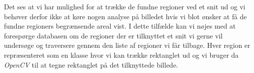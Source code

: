 {Det ses at vi har mulighed for at trække de fundne regioner ved et
snit ud og vi behøver derfor ikke at køre nogen analyse på billedet hvis
vi blot ønsker at få de fundne regioners begrænsende areal vist. I dette
tilfælde kan vi nøjes med at forespørge databasen om de regioner der er
tilknyttet et snit vi gerne vil undersøge og traversere gennem den liste
af regioner vi får tilbage. Hver region er repræsenteret som en klasse
hvor vi kan trække rektanglet ud og vi bruger da \emph{OpenCV} til at
tegne rektanglet på det tilknyttede billede.

}
